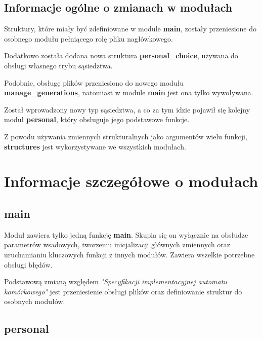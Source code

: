 \documentclass[a4paper]{article}
\begin{document}
\subsection{Informacje og\'olne o zmianach w modu\l{}ach}

\quad Struktury, kt\'ore mia\l{}y by\'c zdefiniowane w module \textbf{main}, 
zosta\l{}y przeniesione do osobnego modu\l{}u pe\l{}ni\k{a}cego rol\k{e} pliku nag\l{}\'owkowego.


Dodatkowo zosta\l{}a dodana nowa struktura \textbf{personal\_choice}, u\.zywana do obs\l{}ugi w\l{}asnego trybu s\k{a}siedztwa.


Podobnie, obs\l{}ug\k{e} plik\'ow przeniesiono do nowego modu\l{}u \\ \textbf{manage\_generations}, natomiast w module \textbf{main} jest ona tylko wywo\l{}ywana.

Zosta\l{} wprowadzony nowy typ s\k{a}siedztwa, a co za tym idzie pojawi\l{} si\k{e} kolejny modu\l{} \textbf{personal}, kt\'ory obs\l{}uguje jego podstawowe funkcje.

Z powodu u\.zywania zmiennych strukturalnych jako argument\'ow wielu funkcji, \textbf{structures} jest wykorzystywane we wszystkich modu\l{}ach.



\section{Informacje szczeg\'o\l{}owe o modu\l{}ach}

\subsection{main}

\quad Modu\l{} zawiera tylko jedn\k{a} funkcj\k{e} \textbf{main}.
Skupia si\k{e} on wy\l{}\k{a}cznie na obs\l{}udze parametr\'ow wsadowych, tworzeniu inicjalizacji g\l{}\'ownych zmiennych oraz uruchamianiu kluczowych funkcji z innych modu\l{}\'ow.
Zawiera wszelkie potrzebne obs\l{}ugi b\l{}\k{e}d\'ow.


Podstawow\k{a} zmian\k{a} wzgl\k{e}dem \textit{"Specyfikacji implementacyjnej automatu kom\'orkowego"} jest przeniesienie obs\l{}ugi plik\'ow oraz definiowanie struktur do osobnych modu\l{}\'ow.

\subsection{personal}
\end{document}
